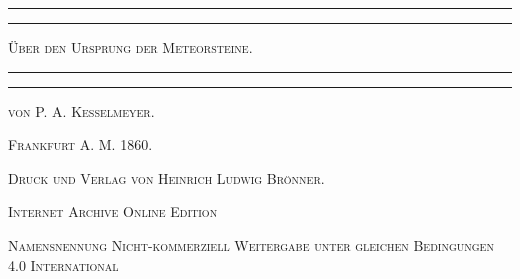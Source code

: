 \documentclass[a4paper, 11pt, oneside, polutonikogreek, german]{article}
\begin{document}
\begin{titlepage} %
	\centering %

	
	\rule{\textwidth}{1.6pt}\vspace*{-\baselineskip}\vspace*{2pt} %
	\rule{\textwidth}{0.4pt} %
	
	\vspace{1\baselineskip} %
	
	{\scshape\LARGE Über den Ursprung der Meteorsteine.}
	
	\vspace{1\baselineskip} %

	\rule{\textwidth}{0.4pt}\vspace*{-\baselineskip}\vspace{3.2pt} %
	\rule{\textwidth}{1.6pt} %
	
	\vspace{1\baselineskip} %
	
	
	{\scshape von P. A. Kesselmeyer.} %
	
	\vspace*{1\baselineskip} %
    
    \vspace*{\fill}

	\vspace{1\baselineskip}

	{\small\scshape Frankfurt A. M. 1860.}
	
	{\small\scshape{Druck und Verlag von Heinrich Ludwig Brönner.}}
	
	\vspace{0.5\baselineskip} %

    \scshape Internet Archive Online Edition  %
	
	{\scshape\small Namensnennung Nicht-kommerziell Weitergabe unter gleichen Bedingungen 4.0 International} %
\end{titlepage}
\setlength{\parskip}{1mm plus1mm minus1mm}
\clearpage
\tableofcontents
\clearpage
\end{document}
